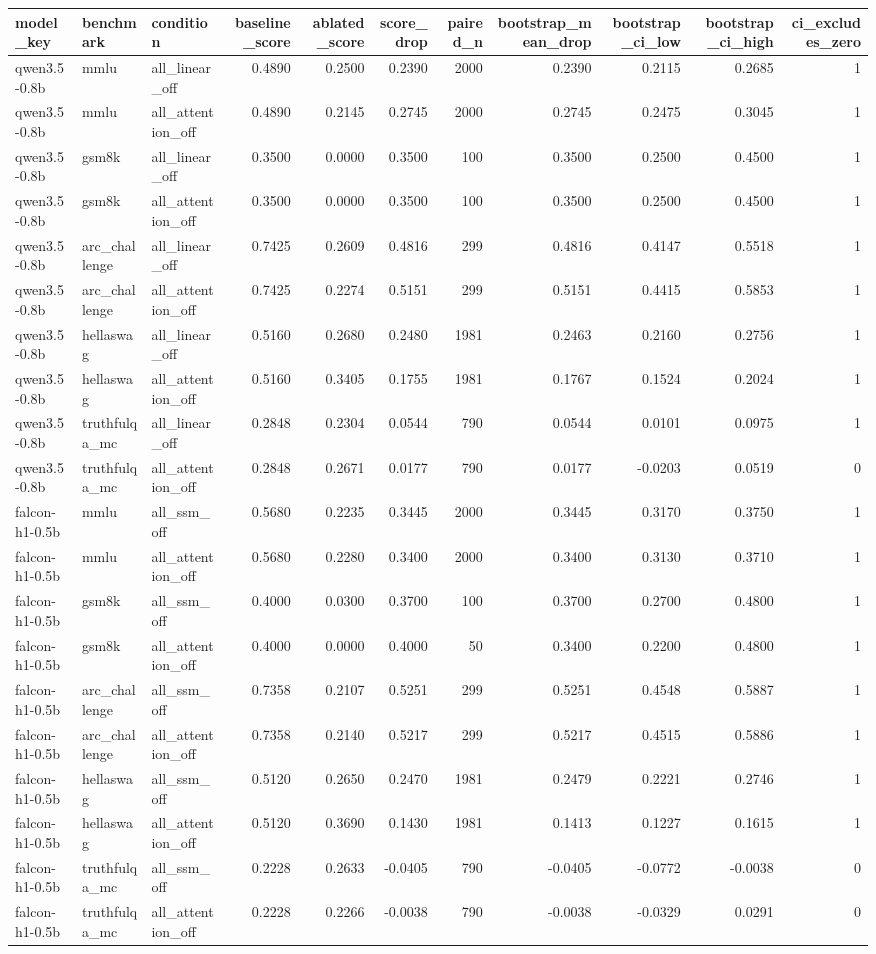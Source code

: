 \begin{tabular}{lllrrrrrrrr}
\toprule
model_key & benchmark & condition & baseline_score & ablated_score & score_drop & paired_n & bootstrap_mean_drop & bootstrap_ci_low & bootstrap_ci_high & ci_excludes_zero \\
\midrule
qwen3.5-0.8b & mmlu & all_linear_off & 0.4890 & 0.2500 & 0.2390 & 2000 & 0.2390 & 0.2115 & 0.2685 & 1 \\
qwen3.5-0.8b & mmlu & all_attention_off & 0.4890 & 0.2145 & 0.2745 & 2000 & 0.2745 & 0.2475 & 0.3045 & 1 \\
qwen3.5-0.8b & gsm8k & all_linear_off & 0.3500 & 0.0000 & 0.3500 & 100 & 0.3500 & 0.2500 & 0.4500 & 1 \\
qwen3.5-0.8b & gsm8k & all_attention_off & 0.3500 & 0.0000 & 0.3500 & 100 & 0.3500 & 0.2500 & 0.4500 & 1 \\
qwen3.5-0.8b & arc_challenge & all_linear_off & 0.7425 & 0.2609 & 0.4816 & 299 & 0.4816 & 0.4147 & 0.5518 & 1 \\
qwen3.5-0.8b & arc_challenge & all_attention_off & 0.7425 & 0.2274 & 0.5151 & 299 & 0.5151 & 0.4415 & 0.5853 & 1 \\
qwen3.5-0.8b & hellaswag & all_linear_off & 0.5160 & 0.2680 & 0.2480 & 1981 & 0.2463 & 0.2160 & 0.2756 & 1 \\
qwen3.5-0.8b & hellaswag & all_attention_off & 0.5160 & 0.3405 & 0.1755 & 1981 & 0.1767 & 0.1524 & 0.2024 & 1 \\
qwen3.5-0.8b & truthfulqa_mc & all_linear_off & 0.2848 & 0.2304 & 0.0544 & 790 & 0.0544 & 0.0101 & 0.0975 & 1 \\
qwen3.5-0.8b & truthfulqa_mc & all_attention_off & 0.2848 & 0.2671 & 0.0177 & 790 & 0.0177 & -0.0203 & 0.0519 & 0 \\
falcon-h1-0.5b & mmlu & all_ssm_off & 0.5680 & 0.2235 & 0.3445 & 2000 & 0.3445 & 0.3170 & 0.3750 & 1 \\
falcon-h1-0.5b & mmlu & all_attention_off & 0.5680 & 0.2280 & 0.3400 & 2000 & 0.3400 & 0.3130 & 0.3710 & 1 \\
falcon-h1-0.5b & gsm8k & all_ssm_off & 0.4000 & 0.0300 & 0.3700 & 100 & 0.3700 & 0.2700 & 0.4800 & 1 \\
falcon-h1-0.5b & gsm8k & all_attention_off & 0.4000 & 0.0000 & 0.4000 & 50 & 0.3400 & 0.2200 & 0.4800 & 1 \\
falcon-h1-0.5b & arc_challenge & all_ssm_off & 0.7358 & 0.2107 & 0.5251 & 299 & 0.5251 & 0.4548 & 0.5887 & 1 \\
falcon-h1-0.5b & arc_challenge & all_attention_off & 0.7358 & 0.2140 & 0.5217 & 299 & 0.5217 & 0.4515 & 0.5886 & 1 \\
falcon-h1-0.5b & hellaswag & all_ssm_off & 0.5120 & 0.2650 & 0.2470 & 1981 & 0.2479 & 0.2221 & 0.2746 & 1 \\
falcon-h1-0.5b & hellaswag & all_attention_off & 0.5120 & 0.3690 & 0.1430 & 1981 & 0.1413 & 0.1227 & 0.1615 & 1 \\
falcon-h1-0.5b & truthfulqa_mc & all_ssm_off & 0.2228 & 0.2633 & -0.0405 & 790 & -0.0405 & -0.0772 & -0.0038 & 0 \\
falcon-h1-0.5b & truthfulqa_mc & all_attention_off & 0.2228 & 0.2266 & -0.0038 & 790 & -0.0038 & -0.0329 & 0.0291 & 0 \\
\bottomrule
\end{tabular}
